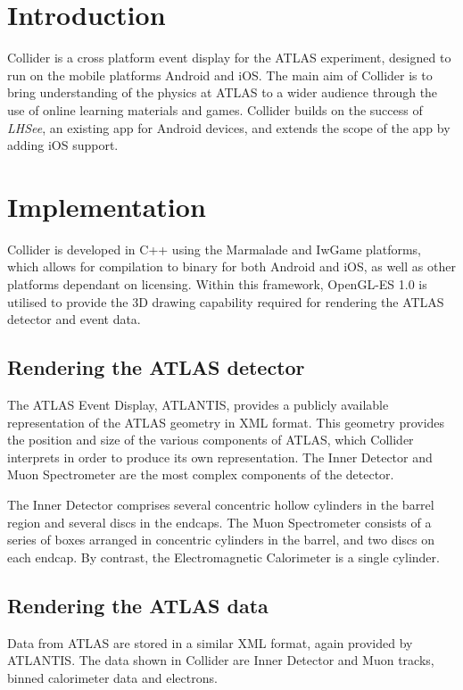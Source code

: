 \documentclass[12pt]{article}
\begin{document}
\maketitle

\section{Introduction}
Collider is a cross platform event display for the ATLAS experiment, designed to run on the mobile platforms Android and iOS.
The main aim of Collider is to bring understanding of the physics at ATLAS to a wider audience through the use of online learning materials and games. Collider builds on the success of \emph{LHSee}, an existing app for Android devices, and extends the scope of 
the app by adding iOS support.

\section{Implementation}
Collider is developed in C++ using the Marmalade\cite{marmalade} and IwGame\cite{iwgame} platforms, which allows for compilation to 
binary for both Android and iOS, as well as other platforms dependant on licensing. Within this framework, OpenGL-ES 1.0 is utilised 
to provide the 3D drawing capability required for rendering the ATLAS detector and event data.

\subsection{Rendering the ATLAS detector}
The ATLAS Event Display, ATLANTIS\cite{atlantis}, provides a publicly available representation of the ATLAS geometry in XML format. This 
geometry provides the position and size of the various components of ATLAS, which Collider interprets in order to produce its own 
representation. The Inner Detector and Muon Spectrometer are the most complex components of the detector.

The Inner Detector comprises several concentric hollow cylinders in the barrel region and several discs in the endcaps. The Muon 
Spectrometer consists of a series of boxes arranged in concentric cylinders in the barrel, and two discs on each endcap.
By contrast, the Electromagnetic Calorimeter is a single cylinder.

\subsection{Rendering the ATLAS data}
Data from ATLAS are stored in a similar XML format, again provided by ATLANTIS. The data shown in Collider are Inner Detector and Muon tracks, binned calorimeter data and electrons.
\end{document}
